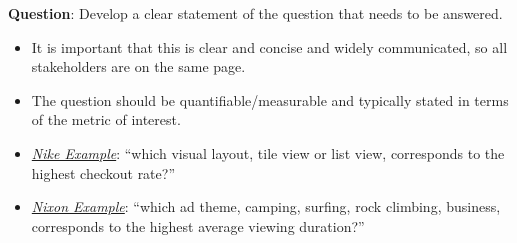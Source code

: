 \begin{framed}
    \textbf{Question}: Develop a clear statement of the question that needs to be answered.
    \begin{itemize}
        \item It is important that this is clear and concise and widely communicated,
              so all stakeholders are on the same page.
        \item The question should be quantifiable/measurable and typically stated
              in terms of the metric of interest.
    \end{itemize}
    \begin{Example}{}{}
        \begin{itemize}
            \item \emph{\hyperref[ex:nike_ex]{Nike Example}}: ``which visual layout, tile view
                  or list view, corresponds to the highest checkout rate?''
            \item \emph{\hyperref[ex:nixon_ex]{Nixon Example}}:
                  ``which ad theme, camping, surfing, rock climbing, business, corresponds to
                  the highest average viewing duration?''
        \end{itemize}
    \end{Example}
\end{framed}
